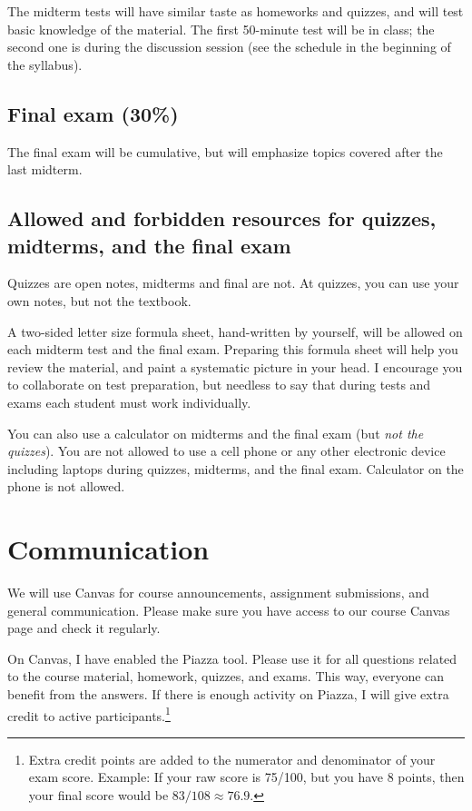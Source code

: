 \documentclass[oneside,11pt]{amsart}
\begin{document}
The midterm tests will have similar taste as homeworks and quizzes, and will test basic knowledge of the material. The first 50-minute test will be in class; the second one is during the discussion session (see the schedule in the beginning of the syllabus).

\subsection{Final exam (30\%)}
The final exam will be cumulative, but will emphasize topics covered after the last midterm.

\subsection*{Allowed and forbidden resources for quizzes, midterms, and the final exam}

Quizzes are open notes, midterms and final are not. At quizzes, you can use your own notes, but not the textbook.

A two-sided letter size formula sheet, hand-written by yourself, will be allowed on each midterm test and the final exam. Preparing this formula sheet will help you review the material, and paint a systematic picture in your head. I encourage you to collaborate on test preparation, but needless to say that during tests and exams each student must work individually.

You can also use a calculator on midterms and the final exam (but \emph{not the quizzes}). You are not allowed to use a cell phone or any other electronic device including laptops during quizzes, midterms, and the final exam. Calculator on the phone is not allowed.
	
\section{Communication} \label{comm} 

We will use Canvas for course announcements, assignment submissions, and general communication. Please make sure you have access to our course Canvas page and check it regularly.


On Canvas, I have enabled the Piazza tool. Please use it for all questions related to the course material, homework, quizzes, and exams. This way, everyone can benefit from the answers. If there is enough activity on Piazza, I will give extra credit to active participants.\footnote{Extra credit points are added to the numerator and denominator of your exam score. Example: If your raw score is 75/100, but you have 8 points, then your final score would be $83/108 \approx 76.9$.}
\end{document}
